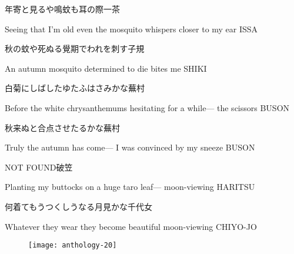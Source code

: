 \begin{haiku}
    {\FH 年寄と見るや鳴蚊も耳の際}\hfill{\FH 一茶}

    \vin{} Seeing that I'm old
    \vin{} \vin{} even the mosquito whispers
    \vin{} \vin{} \vin{} closer to my ear \hspace{\fill} ISSA
\end{haiku}

\begin{haiku}
    {\FH 秋の蚊や死ぬる覺期でわれを刺す}\hfill{\FH 子規}

    \vin{} An autumn mosquito
    \vin{} \vin{} determined to die
    \vin{} \vin{} \vin{} bites me \hspace{\fill} SHIKI
\end{haiku}

\begin{haiku}
    {\FH 白菊にしばしたゆたふはさみかな}\hfill{\FH 蕪村}

    \vin{} Before the white chrysanthemums
    \vin{} \vin{} hesitating for a while---
    \vin{} \vin{} \vin{} the scissors \hspace{\fill} BUSON
\end{haiku}

\begin{haiku}
    {\FH 秋来ぬと合点させたるかな}\hfill{\FH 蕪村}

    \vin{} Truly the autumn has come---
    \vin{} \vin{} I was convinced
    \vin{} \vin{} \vin{} by my sneeze \hspace{\fill} BUSON
\end{haiku}

\begin{haiku}
    {NOT FOUND}\hfill{\FH 破笠}

    \vin{} Planting my buttocks
    \vin{} \vin{} on a huge taro leaf---
    \vin{} \vin{} \vin{} moon-viewing \hspace{\fill} HARITSU
\end{haiku}

\begin{haiku}
    {\FH 何着てもうつくしうなる月見かな}\hfill{\FH 千代女}

    \vin{} Whatever they wear
    \vin{} \vin{} they become beautiful
    \vin{} \vin{} \vin{} moon-viewing \hspace{\fill} CHIYO-JO
\end{haiku}

\begin{figure}
    \texttt{[image: anthology-20]}
\end{figure}

